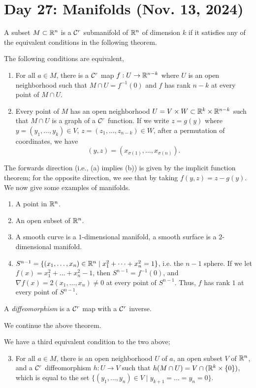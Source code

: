 \section{Day 27: Manifolds (Nov. 13, 2024)}
A subset $M \subset \mathbb R^n$ is a $\mathcal C^r$ submanifold of $\mathbb R^n$ of dimension $k$ if it satisfies any of the equivalent conditions in the following theorem.
\begin{simplethm}
    The following conditions are equivalent,
    \begin{enumerate}[label=(\alph*)]
        \item For all $a \in M$, there is a $\mathcal C^r$ map $f : U \to \mathbb R^{n-k}$ where $U$ is an open neighborhood such that $M \cap U = f^{-1}(0)$ and $f$ has rank $n-k$ at every point of $M \cap U$.
        \item Every point of $M$ has an open neighborhood $U = V \times W \subset \mathbb R^{k} \times \mathbb R^{n-k}$ such that $M \cap U$ is a graph of a $\mathcal C^r$ function. If we write $z = g(y)$ where $y = (y_1, \dots, y_k) \in V$, $z = (z_1, \dots, z_{n-k}) \in W$, after a permutation of coordinates, we have
        \[ (y, z) = (x_{\sigma(1)}, \dots, x_{\sigma(n)}). \]
    \end{enumerate}
\end{simplethm}
\noindent The forwards direction (i.e., (a) implies (b)) is given by the implicit function theorem; for the opposite direction, we see that by taking $f(y, z) = z - g(y)$.
\medskip\newline
We now give some examples of manifolds.
\begin{enumerate}[label=(\alph*)]
    \item A point in $\mathbb R^n$.
    \item An open subset of $\mathbb R^n$.
    \item A smooth curve is a $1$-dimensional manifold, a smooth surface is a $2$-dimensional manifold.
    \item $S^{n-1} = \{(x_1, \dots, x_n) \in \mathbb R^n \mid x_1^2 + \dots + x_n^2 = 1\}$, i.e. the $n-1$ sphere. If we let $f(x) = x_1^2 + \dots + x_n^2 - 1$, then $S^{n-1} = f^{-1}({0})$, and $\nabla f(x) = 2(x_1, \dots, x_n) \neq 0$ at every point of $S^{n-1}$. Thus, $f$ has rank $1$ at every point of $S^{n-1}$.
\end{enumerate}
\begin{definition}
    A \textit{diffeomorphism} is a $\mathcal C^r$ map with a $\mathcal C^r$ inverse.
\end{definition}
\noindent We continue the above theorem.
\begin{simplethm}
    We have a third equivalent condition to the two above;
    \begin{enumerate}[label=(\alph*)]
        \setcounter{enumi}{2}
        \item For all $a \in M$, there is an open neighborhood $U$ of $a$, an open subset $V$ of $\mathbb R^n$, and a $\mathcal C^r$ diffeomorphism $h : U \to V$ such that $h(M \cap U) = V \cap (\mathbb R^k \times \{0\})$, which is equal to the set $\{(y_1, \dots, y_n) \in V \mid y_{k+1} = \dots = y_n = 0 \}$.
    \end{enumerate}
\end{simplethm}

